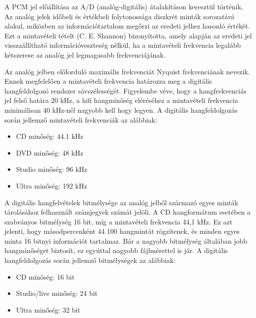 A PCM jel előállítása az A/D (analóg-digitális) átalakításon keresztül történik. 
Az analóg jelek időbeli és értékbeli folytonossága diszkrét minták sorozatává alakul, 
miközben az információtartalom megőrzi az eredeti jelhez hasonló értékét. 
Ezt a mintavételi tételt (C. E. Shannon) bizonyította, amely alapján az eredeti jel 
visszaállítható információveszteség nélkül, ha a mintavételi frekvencia legalább 
kétszerese az analóg jel legmagasabb frekvenciájának.

Az analóg jelben előforduló maximális frekvenciát Nyquist frekvenciának nevezik. 
Ennek megfelelően a mintavételi frekvencia határozza meg a digitális hangfeldolgozó rendszer sávszélességét. 
Figyelembe véve, hogy a hangfrekvenciás jel felső határa 20 kHz, a hifi hangminőség eléréséhez a 
mintavételi frekvencia minimálisan 40 kHz-nél nagyobb kell hogy legyen. A digitális hangfeldolgozás során jellemző mintavételi frekvenciák az alábbiak:
\begin{itemize}
    \item CD minőség: 44.1 kHz
    \item DVD minőség: 48 kHz
    \item Studio minőség: 96 kHz
    \item Ultra minőség: 192 kHz
\end{itemize}
A digitális hangfelvételek bitmélysége az analóg jelből származó egyes minták tárolásához 
felhasznált számjegyek számát jelöli. A CD hangformátum esetében a szabványos bitmélység 16 bit, 
míg a mintavételi frekvencia 44,1 kHz. Ez azt jelenti, hogy másodpercenként 44 100 hangmintát rögzítenek, 
és minden egyes minta 16 bitnyi információt tartalmaz. 
Bár a nagyobb bitmélység általában jobb hangminőséget biztosít, ez egyúttal nagyobb fájlmérettel is jár.
A digitális hangfeldolgozás során jellemző bitmélységek az alábbiak:
\begin{itemize}
    \item CD minőség: 16 bit
    \item Studio/live minőség: 24 bit
    \item Ultra minőség: 32 bit
\end{itemize}
